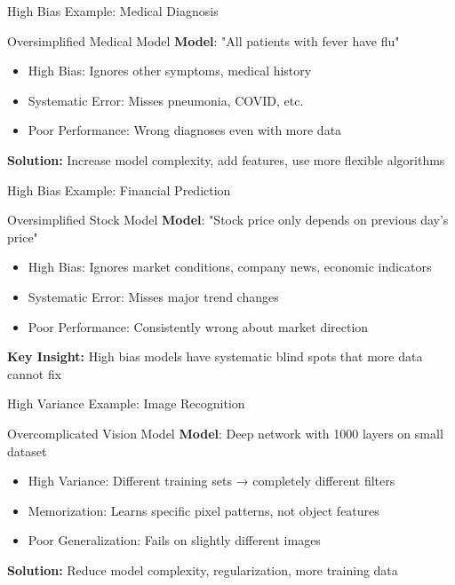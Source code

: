 \documentclass[aspectratio=169,10pt]{beamer}
\begin{document}
\begin{frame}{High Bias Example: Medical Diagnosis}
\begin{examplebox}{Oversimplified Medical Model}
\textbf{Model}: "All patients with fever have flu"
\begin{itemize}
\item High Bias: Ignores other symptoms, medical history
\item Systematic Error: Misses pneumonia, COVID, etc.
\item Poor Performance: Wrong diagnoses even with more data
\end{itemize}
\end{examplebox}

\begin{keypointsbox}
\textbf{Solution:} Increase model complexity, add features, use more flexible algorithms
\end{keypointsbox}
\end{frame}

\begin{frame}{High Bias Example: Financial Prediction}
\begin{examplebox}{Oversimplified Stock Model}
\textbf{Model}: "Stock price only depends on previous day's price"
\begin{itemize}
\item High Bias: Ignores market conditions, company news, economic indicators
\item Systematic Error: Misses major trend changes
\item Poor Performance: Consistently wrong about market direction
\end{itemize}
\end{examplebox}

\begin{keypointsbox}
\textbf{Key Insight:} High bias models have systematic blind spots that more data cannot fix
\end{keypointsbox}
\end{frame}


\begin{frame}{High Variance Example: Image Recognition}
\begin{examplebox}{Overcomplicated Vision Model}
\textbf{Model}: Deep network with 1000 layers on small dataset
\begin{itemize}
\item High Variance: Different training sets → completely different filters
\item Memorization: Learns specific pixel patterns, not object features
\item Poor Generalization: Fails on slightly different images
\end{itemize}
\end{examplebox}

\begin{keypointsbox}
\textbf{Solution:} Reduce model complexity, regularization, more training data
\end{keypointsbox}
\end{frame}
\end{document}
